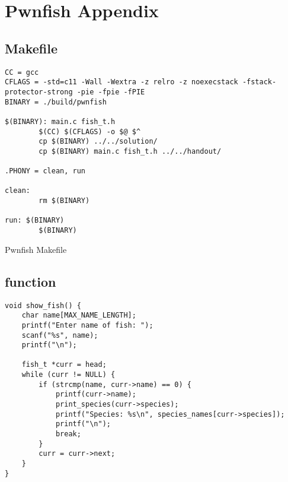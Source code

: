 \section{Pwnfish Appendix}

\subsection{Makefile}\label{apx:pwnfish-makefile}

\begin{verbatim}
CC = gcc
CFLAGS = -std=c11 -Wall -Wextra -z relro -z noexecstack -fstack-protector-strong -pie -fpie -fPIE
BINARY = ./build/pwnfish

$(BINARY): main.c fish_t.h
        $(CC) $(CFLAGS) -o $@ $^
        cp $(BINARY) ../../solution/
        cp $(BINARY) main.c fish_t.h ../../handout/

.PHONY = clean, run

clean:
        rm $(BINARY)

run: $(BINARY)
        $(BINARY)
\end{verbatim}
\begin{listing}[H]
    \caption{Pwnfish Makefile}
    \label{lst:pwnfish-makefile}
\end{listing}

\subsection{ function}\label{apx:show_fish}


\begin{verbatim}
void show_fish() {
    char name[MAX_NAME_LENGTH];
    printf("Enter name of fish: ");
    scanf("%s", name);
    printf("\n");

    fish_t *curr = head;
    while (curr != NULL) {
        if (strcmp(name, curr->name) == 0) {
            printf(curr->name);
            print_species(curr->species);
            printf("Species: %s\n", species_names[curr->species]);
            printf("\n");
            break;
        }
        curr = curr->next;
    }
}
\end{verbatim}
\begin{listing}[H]
    \caption{}
    \label{fig:show-fish}
\end{listing}

\subsection{}\label{apx:pwnfish-solve}

